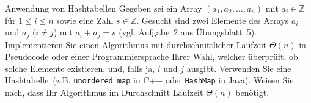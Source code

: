 \documentclass[11pt,a4paper]{article}
\begin{document}
\begin{aufgabe}{4}{Anwendung von Hashtabellen}
    Gegeben sei ein Array $(a_1, a_2, \ldots, a_n)$ mit $a_i \in \mathbb{Z}$ für $1 \leq i \leq n$ sowie eine Zahl $s \in \mathbb{Z}$.
    Gesucht sind zwei Elemente des Arrays $a_i$ und $a_j$ ($i \neq j$) mit $a_i + a_j = s$ (vgl. Aufgabe~2 aus Übungsblatt~5).
    Implementieren Sie einen Algorithmus mit durchschnittlicher Laufzeit $\Theta(n)$ in Pseudocode oder einer Programmiersprache Ihrer Wahl, welcher überprüft, ob solche Elemente existieren, und, falls ja, $i$ und $j$ ausgibt.
    Verwenden Sie eine Hash\-ta\-bel\-le~(z.B. \texttt{unordered\_map} in C++ oder \texttt{HashMap} in Java).
    Weisen Sie nach, dass Ihr Algorithmus im Durchschnitt Laufzeit $\Theta(n)$ benötigt.
\end{aufgabe}
\end{document}
